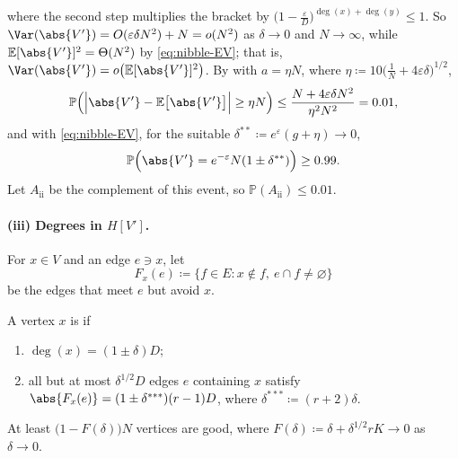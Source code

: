 where the second step multiplies the bracket by \(\bigl( 1 - \frac{\varepsilon}{D} \bigr)^{\deg(x) + \deg(y)} \le 1\). So \(\Var(\abs{V'}) = O(\varepsilon \delta N^{2}) + N = o(N^{2})\) as \(\delta \to 0\) and \(N \to \infty\), while \(\mathbb{E}[\abs{V'}]^{2} = \Theta(N^{2})\) by \eqref{eq:nibble-EV}; that is, \(\Var(\abs{V'}) = o\bigl( \mathbb{E}[\abs{V'}]^{2} \bigr)\). By  with \(a = \eta N\), where \(\eta \coloneqq 10 \bigl( \frac{1}{N} + 4\varepsilon\delta \bigr)^{1/2}\),
\[
    \mathbb{P}\Bigl( \Bigl| \abs{V'} - \mathbb{E}\bigl[ \abs{V'} \bigr] \Bigr| \ge \eta N \Bigr) \le \frac{N + 4\varepsilon\delta N^{2}}{\eta^{2} N^{2}} = 0.01 ,
\]
and with \eqref{eq:nibble-EV}, for the suitable \(\delta^{**} \coloneqq e^{\varepsilon}(g + \eta) \to 0\),
\[
    \mathbb{P}\Bigl( \abs{V'} = e^{-\varepsilon} N (1 \pm \delta^{**}) \Bigr) \ge 0.99 .
\]
Let \(A_{\mathrm{ii}}\) be the complement of this event, so \(\mathbb{P}(A_{\mathrm{ii}}) \le 0.01\).

\paragraph{(iii) Degrees in \(H[V']\).} For \(x \in V\) and an edge \(e \ni x\), let
\[
    F_{x}(e) \coloneqq \{ f \in E : x \notin f,\ e \cap f \ne \varnothing \}
\]
be the edges that meet \(e\) but avoid \(x\).

\begin{definition}\label{def:good-vertex}
    A vertex \(x\) is  if
    \begin{enumerate}[(G1)]
        \item \(\deg(x) = (1 \pm \delta) D\);
        \item all but at most \(\delta^{1/2} D\) edges \(e\) containing \(x\) satisfy \(\abs{F_{x}(e)} = (1 \pm \delta^{***})(r-1) D\), where \(\delta^{***} \coloneqq (r+2)\delta\).
    \end{enumerate}
\end{definition}

\begin{claim}\label{claim:good-vertices}
    At least \(\bigl( 1 - F(\delta) \bigr) N\) vertices are good, where \(F(\delta) \coloneqq \delta + \delta^{1/2} r K \to 0\) as \(\delta \to 0\).
\end{claim}

\begin{center}
\end{center}

